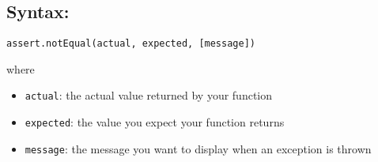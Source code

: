 \subsection*{Syntax:}
\begin{center}\texttt{assert.notEqual(actual, expected, [message])}

\end{center}where
\begin{itemize}
\item \texttt{actual}: the actual value returned by your function
\item \texttt{expected}: the value you expect your function returns
\item \texttt{message}: the message you want to display when an exception is thrown
\end{itemize}

